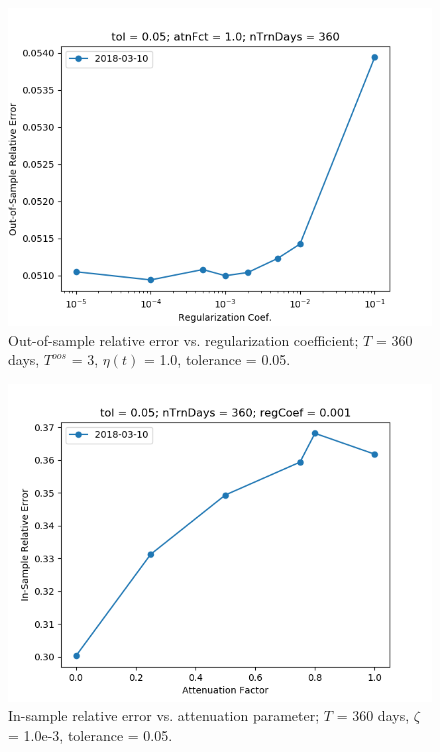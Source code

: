 \documentclass{article}
\begin{document}
\begin{figure}
\includegraphics[scale=0.9,bb=0 0 640 480]{figures/regCoef-sensitivity-oos-error.png}
\caption{Out-of-sample relative error vs. regularization coefficient;
  $T$ = 360 days, $T^{oos}$ = 3, $\eta(t)$ = 1.0, tolerance = 0.05.}
\label{fig:regCoef-sensitivity-oos-error}
\end{figure}

\begin{figure}
\includegraphics[scale=0.9,bb=0 0 640 480]{figures/atnFct-sensitivity-error.png}
\caption{In-sample relative error vs. attenuation parameter; $T$ = 360
  days, $\zeta$ = 1.0e-3, tolerance = 0.05.}
\label{fig:atnFct-sensitivity-error}
\end{figure}
\end{document}
